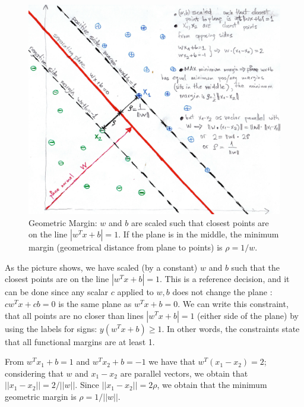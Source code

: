 \documentclass[a4paper]{article}
\begin{document}
\begin{figure}[t!]
  \hspace{-10ex}
    \includegraphics[width=1.2\textwidth]{images/svm_margin}
  \caption{Geometric Margin: $w$ and $b$ are scaled such that closest points are on the line $|w^Tx+b|=1$. If the plane is in the middle, the minimum margin (geometrical distance from plane to points) is $\rho = 1/w$. }\label{fig:geometric}
\end{figure}

As the picture shows, we have scaled (by a constant) $w$ and $b$ such that the closest points are on the line $|w^Tx+b|=1$. This is a reference decision, and it can be done since any scalar $c$ applied to $w,b$ does not change the plane : $cw^Tx+cb=0$ is the same plane as $w^Tx+b=0$. We can write this constraint, that all points are no closer than lines $|w^Tx+b|=1$ (either side of the plane) by using the labels for signs: $y(w^Tx+b)\geq1$. In other words, the constraints state that all functional margins are at least 1.

From $w^Tx_1+b=1$ and $w^Tx_2+b=-1$ we have that $w^T(x_1-x_2)=2$; considering that $w$ and $x_1-x_2$ are parallel vectors, we obtain that $||x_1-x_2|| = 2 / ||w||$. Since $||x_1-x_2|| = 2\rho$, we obtain that the minimum geometric margin is $\rho = 1/||w||$. 
\end{document}
